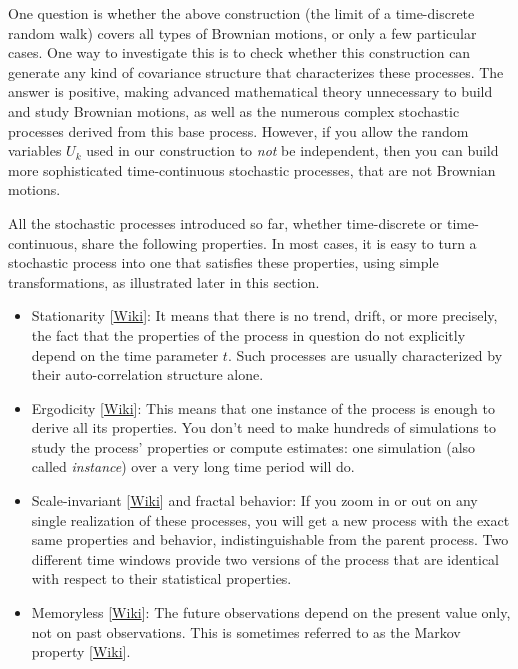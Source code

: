 \documentclass[oneside,10pt]{book}
\begin{document}
One question is whether the above construction (the limit of a time-discrete random walk) covers all types of Brownian motions, or only a few particular cases. One way to investigate this is to check whether this construction can generate any kind of covariance structure that characterizes these processes. The answer is positive, making advanced mathematical theory unnecessary to build and study Brownian motions, as well as the numerous complex stochastic processes derived from this base process.  However, if you allow the random variables $U_k$ used in our construction to {\em not} be independent, then you can build more sophisticated time-continuous stochastic processes, that are not Brownian motions.


All the stochastic processes introduced so far, whether time-discrete or time-continuous, share the following properties. In most cases, it is easy to turn a stochastic process into one that satisfies these properties, using simple transformations, as illustrated later in this section.\vspace{1ex}
\begin{itemize}
\item \textcolor{index}{Stationarity} [\href{https://en.wikipedia.org/wiki/Stationary_process}{Wiki}]: It means that there is no trend, drift, or more precisely, the fact that the properties of the process in question do not explicitly depend on the time parameter $t$. Such processes are usually characterized by their auto-correlation structure alone.
\item \textcolor{index}{Ergodicity} [\href{https://en.wikipedia.org/wiki/Ergodicity}{Wiki}]: This means that one instance of the process is enough to derive all its properties. You don't need to make hundreds of simulations to study the process' properties or compute estimates: one simulation (also called {\em instance}) over a very long time period will do.

\item \textcolor{index}{Scale-invariant} [\href{https://en.wikipedia.org/wiki/Scale_invariance}{Wiki}] and fractal behavior: If you zoom in or out on any single realization of these processes, you will get a new process with the exact same properties and behavior, indistinguishable from the parent process. Two different time windows provide two versions of the process that are identical with respect to their statistical properties.

\item \textcolor{index}{Memoryless} [\href{https://en.wikipedia.org/wiki/Memorylessness}{Wiki}]: The future observations depend on the present value only, not on past observations. This is sometimes referred to as
the \textcolor{index}{Markov property} [\href{https://en.wikipedia.org/wiki/Markov_property}{Wiki}].
\end{itemize}\vspace{1ex}
\end{document}
